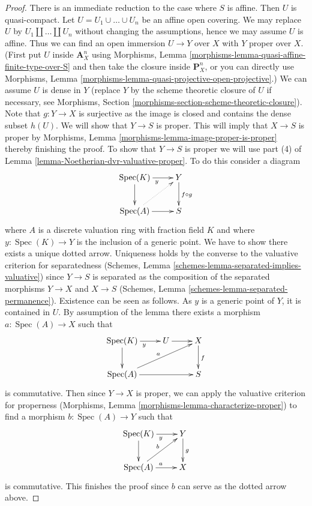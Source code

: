 \documentclass[10pt,a4paper]{amsart}
\theoremstyle{plain}
\theoremstyle{definition}
\theoremstyle{remark}
\numberwithin{equation}{subsection}
\def\Spec{\mathop{\mathrm{Spec}}}
\begin{document}
\begin{proof}
There is an immediate reduction to the case where $S$ is affine.
Then $U$ is quasi-compact.
Let $U = U_1 \cup \ldots \cup U_n$ be an affine open covering.
We may replace $U$ by $U_1 \amalg \ldots \amalg U_n$ without
changing the assumptions, hence we may assume $U$ is affine.
Thus we can find an open immersion $U \to Y$ over $X$
with $Y$ proper over $X$. (First put $U$ inside $\mathbf{A}^n_X$
using Morphisms, Lemma \ref{morphisms-lemma-quasi-affine-finite-type-over-S}
and then take the closure inside $\mathbf{P}^n_X$, or you can directly
use Morphisms, Lemma \ref{morphisms-lemma-quasi-projective-open-projective}.)
We can assume $U$ is dense in $Y$ (replace $Y$ by the scheme theoretic
closure of $U$ if necessary, see Morphisms, Section
\ref{morphisms-section-scheme-theoretic-closure}).
Note that $g : Y \to X$ is surjective as the image is closed
and contains the dense subset $h(U)$.
We will show that $Y \to S$ is proper. This will imply that
$X \to S$ is proper by
Morphisms, Lemma \ref{morphisms-lemma-image-proper-is-proper}
thereby finishing the proof.
To show that $Y \to S$ is proper we will use
part (4) of Lemma \ref{lemma-Noetherian-dvr-valuative-proper}.
To do this consider a diagram
$$
\xymatrix{
\Spec(K) \ar[r]_y \ar[d] & Y \ar[d]^{f \circ g} \\
\Spec(A) \ar[r] \ar@{..>}[ru] & S
}
$$
where $A$ is a discrete valuation ring with fraction field $K$
and where $y : \Spec(K) \to Y$ is the inclusion of a generic point.
We have to show there exists a unique dotted arrow.
Uniqueness holds by the converse to the valuative criterion
for separatedness
(Schemes, Lemma \ref{schemes-lemma-separated-implies-valuative})
since $Y \to S$ is separated as the
composition of the separated morphisms $Y \to X$ and $X \to S$
(Schemes, Lemma \ref{schemes-lemma-separated-permanence}).
Existence can be seen as follows.
As $y$ is a generic point of $Y$, it is contained in $U$.
By assumption of the lemma
there exists a morphism $a : \Spec(A) \to X$ such that
$$
\xymatrix{
\Spec(K) \ar[r]_y \ar[d] & U \ar[r] & X \ar[d]^f \\
\Spec(A) \ar[rr] \ar[rru]^a & & S
}
$$
is commutative. Then since $Y \to X$ is proper, we can
apply the valuative criterion for properness
(Morphisms, Lemma \ref{morphisms-lemma-characterize-proper})
to find a morphism $b : \Spec(A) \to Y$ such that
$$
\xymatrix{
\Spec(K) \ar[r]_y \ar[d] & Y \ar[d]^g \\
\Spec(A) \ar[r]^a \ar[ru]^b & X
}
$$
is commutative. This finishes the proof since
$b$ can serve as the dotted arrow above.
\end{proof}
\end{document}

